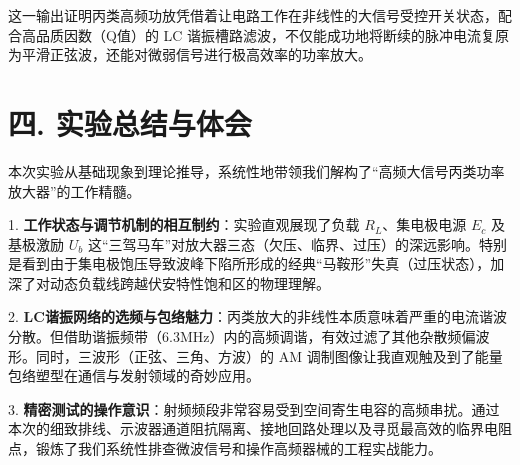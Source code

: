 \documentclass[12pt]{article}
\begin{document}
这一输出证明丙类高频功放凭借着让电路工作在非线性的大信号受控开关状态，配合高品质因数（Q值）的 LC 谐振槽路滤波，不仅能成功地将断续的脉冲电流复原为平滑正弦波，还能对微弱信号进行极高效率的功率放大。

\section*{四. 实验总结与体会}

本次实验从基础现象到理论推导，系统性地带领我们解构了“高频大信号丙类功率放大器”的工作精髓。

1. \textbf{工作状态与调节机制的相互制约}：实验直观展现了负载 $R_L$、集电极电源 $E_c$ 及基极激励 $U_b$ 这“三驾马车”对放大器三态（欠压、临界、过压）的深远影响。特别是看到由于集电极饱压导致波峰下陷所形成的经典“马鞍形”失真（过压状态），加深了对动态负载线跨越伏安特性饱和区的物理理解。

2. \textbf{LC谐振网络的选频与包络魅力}：丙类放大的非线性本质意味着严重的电流谐波分散。但借助谐振频带（6.3MHz）内的高频调谐，有效过滤了其他杂散频偏波形。同时，三波形（正弦、三角、方波）的 AM 调制图像让我直观触及到了能量包络塑型在通信与发射领域的奇妙应用。

3. \textbf{精密测试的操作意识}：射频频段非常容易受到空间寄生电容的高频串扰。通过本次的细致排线、示波器通道阻抗隔离、接地回路处理以及寻觅最高效的临界电阻点，锻炼了我们系统性排查微波信号和操作高频器械的工程实战能力。
\end{document}
